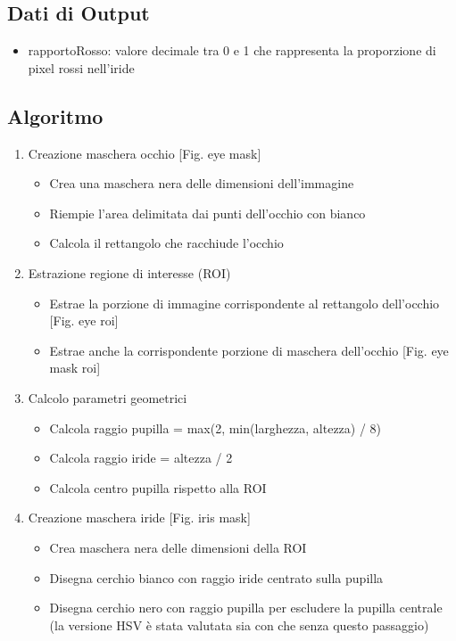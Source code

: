 \documentclass[12pt,a4paper,openright,twoside]{book}
\begin{document}
\subsection{Dati di Output}
\begin{itemize}
    \item rapportoRosso: valore decimale tra 0 e 1 che rappresenta la proporzione di pixel rossi nell'iride
\end{itemize}
\subsection{Algoritmo}
\begin{enumerate}
    \item Creazione maschera occhio [Fig. eye mask] \begin{itemize}
        \item Crea una maschera nera delle dimensioni dell'immagine
        \item Riempie l'area delimitata dai punti dell'occhio con bianco
        \item Calcola il rettangolo che racchiude l'occhio
    \end{itemize}
    \item Estrazione regione di interesse (ROI) \begin{itemize}
        \item Estrae la porzione di immagine corrispondente al rettangolo dell'occhio [Fig. eye roi]
        \item Estrae anche la corrispondente porzione di maschera dell'occhio [Fig. eye mask roi]
    \end{itemize}
    \item Calcolo parametri geometrici \begin{itemize}
        \item Calcola raggio pupilla = max(2, min(larghezza, altezza) / 8)
        \item Calcola raggio iride = altezza / 2
        \item Calcola centro pupilla rispetto alla ROI
    \end{itemize}
    \item Creazione maschera iride [Fig. iris mask] \begin{itemize}
        \item Crea maschera nera delle dimensioni della ROI
        \item Disegna cerchio bianco con raggio iride centrato sulla pupilla
        \item Disegna cerchio nero con raggio pupilla per escludere la pupilla centrale (la versione HSV è stata valutata sia con che senza questo passaggio)

\end{itemize}
\end{enumerate}
\end{document}
